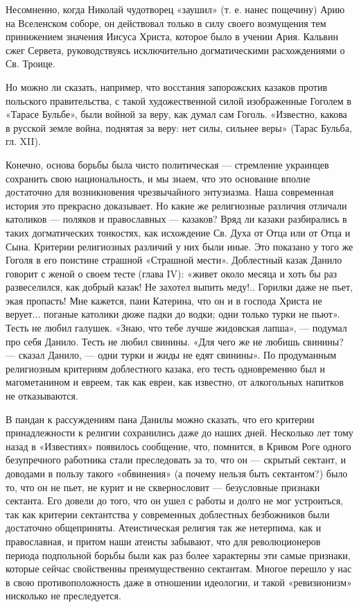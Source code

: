 Несомненно, когда  Николай чудотворец «заушил» (т.  е. нанес пощечину)
Арию  на  Вселенском  соборе,  он  действовал  только  в  силу  своего
возмущения  тем  принижением  значения  Иисуса  Христа,  которое  было
в  учении Ария.  Кальвин  сжег  Сервета, руководствуясь  исключительно
догматическими расхождениями о Св. Троице.

Но  можно  ли сказать,  например,  что  восстания запорожских  казаков
против   польского  правительства,   с   такой  художественной   силой
изображенные Гоголем в «Тарасе Бульбе», были войной за веру, как думал
сам Гоголь. «Известно, какова в русской земле война, поднятая за веру:
нет силы, сильнее веры» (Тарас Бульба, гл. XII).

Конечно,  основа   борьбы  была  чисто  политическая   ---  стремление
украинцев сохранить свою национальность, и мы знаем, что это основание
вполне  достаточно для  возникновения  чрезвычайного энтузиазма.  Наша
современная история это прекрасно  доказывает. Но какие же религиозные
различия отличали  католиков ---  поляков и православных  --- казаков?
Вряд  ли  казаки  разбирались  в таких  догматических  тонкостях,  как
исхождение Св. Духа  от Отца или от Отца и  Сына. Критерии религиозных
различий у них были иные. Это показано у того же Гоголя в его поистине
страшной  «Страшной мести».  Доблестный казак  Данило говорит  с женой
о  своем  тесте  (глава  IV):  «живет  около  месяца  и  хоть  бы  раз
развеселился, как добрый казак! Не захотел выпить меду!.. Горилки даже
не пьет, экая пропасть! Мне кажется, пани Катерина, что он и в господа
Христа не верует... поганые католики  дюже падки до водки; одни только
турки  не  пьют».  Тесть  не  любил галушек.  «Знаю,  что  тебе  лучше
жидовская  лапша»,  ---  подумал  про  себя  Данило.  Тесть  не  любил
свинины. «Для чего  же не любишь свинины? --- сказал  Данило, --- одни
турки и  жиды не едят  свинины». По продуманным  религиозным критериям
доблестного  казака,  его тесть  одновременно  был  и магометанином  и
евреем,  так  как евреи,  как  известно,  от алкогольных  напитков  не
отказываются.

В пандан  к рассуждениям пана  Данилы можно сказать, что  его критерии
принадлежности к религии сохранились даже до наших дней. Несколько лет
тому назад в «Известиях» появилось  сообщение, что, помнится, в Кривом
Роге одного  безупречного работника стали  преследовать за то,  что он
---  скрытый  сектант,  и  доводами в  пользу  такого  «обвинения»  (а
почему  нельзя быть  сектантом?) было  то, что  он не  пьет, не  курит
и  не  сквернословит ---  безусловные  признаки  сектанта. Его  довели
до  того,  что  он ушел  с  работы  и  долго  не мог  устроиться,  так
как  критерии сектантства  у современных  доблестных безбожников  были
достаточно общеприняты. Атеистическая религия  так же нетерпима, как и
православная, и  притом наши атеисты забывают,  что для революционеров
периода  подпольной борьбы  были как  раз более  характерны эти  самые
признаки, которые сейчас свойственны преимущественно сектантам. Многое
перешло у нас  в свою противоположность даже в  отношении идеологии, и
такой «ревизионизм» нисколько не преследуется.

